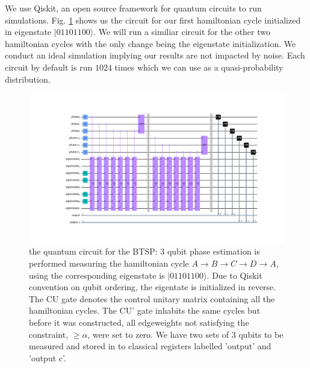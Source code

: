 \documentclass[msc,oneside]{ubcthesis}
\begin{document}
	We use Qiskit, an open source framework for quantum circuits to run simulations. Fig. \ref{fig:4-city-circuit} shows us the circuit for our first hamiltonian cycle initialized in eigenstate $|01101100\rangle$. We will run a similiar circuit for the other two hamiltonian cycles with the only change being the eigenstate initialization. We conduct an ideal simulation implying our results are not impacted by noise. Each circuit by default is run $1024$ times which we can use as a quasi-probability distribution. 
	


 \begin{figure}[!h]
		\centering
		\includegraphics[trim={8.5cm 4.4cm 6cm 4.4cm},clip, width=1 \linewidth]{"graphics/4-city-1-cycle-constrained-barrier"}
		\caption{the quantum circuit for the BTSP: 3 qubit phase estimation is performed measuring the hamiltonian cycle $A \rightarrow B \rightarrow C \rightarrow D \rightarrow A$, using the corresponding eigenstate is $|01101100\rangle$. Due to Qiskit convention on qubit ordering, the eigentate is initialized in reverse. The CU gate denotes the control unitary matrix containing all the hamiltonian cycles. The CU' gate inhabits the same cycles but before it was constructed, all edgeweights not satisfying the constraint, $\geq \alpha$, were set to zero. We have two sets of 3 qubits to be measured and stored in to classical registers labelled 'output' and 'output c'.}
		\label{fig:4-city-circuit}
	\end{figure}		
\end{document}
